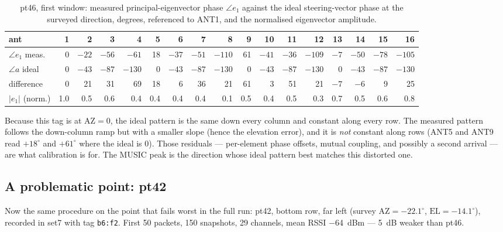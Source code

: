 \documentclass[11pt,a4paper]{article}
\begin{document}
\begin{table}[htbp]\centering\footnotesize\setlength{\tabcolsep}{3pt}
\begin{tabular}{l*{16}{r}}
\toprule
ant & 1 & 2 & 3 & 4 & 5 & 6 & 7 & 8 & 9 & 10 & 11 & 12 & 13 & 14 & 15 & 16 \\
\midrule
$\angle e_1$ meas. & 0 & $-22$ & $-56$ & $-61$ & 18 & $-37$ & $-51$ & $-110$ & 61 & $-41$ & $-36$ & $-109$ & $-7$ & $-50$ & $-78$ & $-105$ \\
$\angle a$ ideal & 0 & $-43$ & $-87$ & $-130$ & 0 & $-43$ & $-87$ & $-130$ & 0 & $-43$ & $-87$ & $-130$ & 0 & $-43$ & $-87$ & $-130$ \\
difference & 0 & 21 & 31 & 69 & 18 & 6 & 36 & 21 & 61 & 3 & 51 & 21 & $-7$ & $-6$ & 9 & 25 \\
$|e_1|$ (norm.) & 1.0 & 0.5 & 0.6 & 0.4 & 0.4 & 0.4 & 0.4 & 0.1 & 0.5 & 0.4 & 0.5 & 0.3 & 0.7 & 0.5 & 0.6 & 0.8 \\
\bottomrule
\end{tabular}
\caption{pt46, first window: measured principal-eigenvector phase $\angle e_1$ against the ideal steering-vector phase at the surveyed direction, degrees, referenced to ANT1, and the normalised eigenvector amplitude.}\label{tab:pt46_e1}
\end{table}

Because this tag is at $\mathrm{AZ} = 0$, the ideal pattern is the same down every column and constant along every row. The measured pattern follows the down-column ramp but with a smaller slope (hence the elevation error), and it is \emph{not} constant along rows (ANT5 and ANT9 read $+18^\circ$ and $+61^\circ$ where the ideal is $0$). Those residuals --- per-element phase offsets, mutual coupling, and possibly a second arrival --- are what calibration is for. The MUSIC peak is the direction whose ideal pattern best matches this distorted one.

\subsection{A problematic point: pt42}
Now the same procedure on the point that fails worst in the full run: pt42, bottom row, far left (survey $\mathrm{AZ} = -22.1^\circ$, $\mathrm{EL} = -14.1^\circ$), recorded in set7 with tag \texttt{b6:f2}. First 50 packets, 150 snapshots, 29 channels, mean RSSI \SI{-64}{dBm} --- \SI{5}{dB} weaker than pt46.
\end{document}
